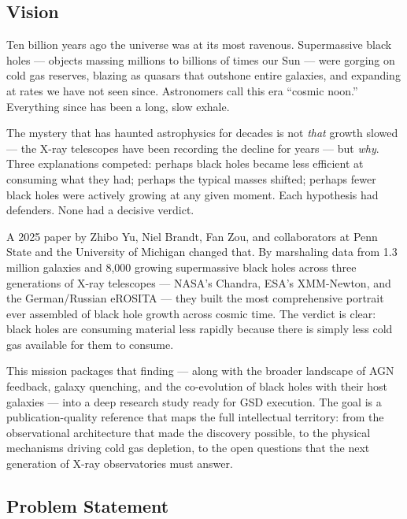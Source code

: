 \documentclass[11pt,letterpaper]{article}
\begin{document}
\subsection{Vision}

Ten billion years ago the universe was at its most ravenous. Supermassive black holes --- objects massing millions to billions of times our Sun --- were gorging on cold gas reserves, blazing as quasars that outshone entire galaxies, and expanding at rates we have not seen since. Astronomers call this era ``cosmic noon.'' Everything since has been a long, slow exhale.

The mystery that has haunted astrophysics for decades is not \emph{that} growth slowed --- the X-ray telescopes have been recording the decline for years --- but \emph{why}. Three explanations competed: perhaps black holes became less efficient at consuming what they had; perhaps the typical masses shifted; perhaps fewer black holes were actively growing at any given moment. Each hypothesis had defenders. None had a decisive verdict.

A 2025 paper by Zhibo Yu, Niel Brandt, Fan Zou, and collaborators at Penn State and the University of Michigan changed that. By marshaling data from 1.3 million galaxies and 8,000 growing supermassive black holes across three generations of X-ray telescopes --- NASA's Chandra, ESA's XMM-Newton, and the German/Russian eROSITA --- they built the most comprehensive portrait ever assembled of black hole growth across cosmic time. The verdict is clear: black holes are consuming material less rapidly because there is simply less cold gas available for them to consume.

This mission packages that finding --- along with the broader landscape of AGN feedback, galaxy quenching, and the co-evolution of black holes with their host galaxies --- into a deep research study ready for GSD execution. The goal is a publication-quality reference that maps the full intellectual territory: from the observational architecture that made the discovery possible, to the physical mechanisms driving cold gas depletion, to the open questions that the next generation of X-ray observatories must answer.

\subsection{Problem Statement}
\end{document}
